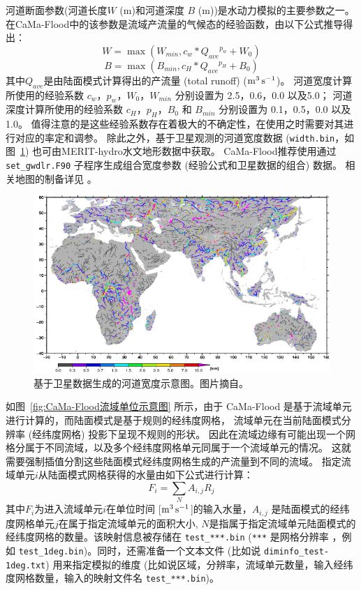 河道断面参数(河道长度$W$ (m)和河道深度 $B$ (m))是水动力模拟的主要参数之一。在CaMa-Flood中的该参数是流域产流量的气候态的经验函数，由以下公式推导得出：
\begin{equation}
W=\max \left(W_{min}, c_{w} * Q_{ave}{}^{p_{w}}+W_{0}\right)
\end{equation}
\begin{equation}
B=\max \left(B_{min}, c_{H} * Q_{ave}{}^{p_{H}}+B_{0}\right)
\end{equation}
其中$Q_{ave}$是由陆面模式计算得出的产流量 (total runoff) ($\rm m^3\,s^{-1}$)。
河道宽度计算所使用的经验系数 $c_w$，$p_w$，$W_0$，$W_{min}$ 分别设置为 2.5，0.6，0.0 以及5.0；
河道深度计算所使用的经验系数 $c_H$，$p_H$，$B_0$ 和 $B_{min}$ 分别设置为 0.1，0.5，0.0 以及1.0。
值得注意的是这些经验系数存在着极大的不确定性，在使用之时需要对其进行对应的率定和调参。
除此之外，基于卫星观测的河道宽度数据 (\texttt{width.bin}，如图~\ref{fig:基于卫星数据生成的河道宽度示意图}) 也可由MERIT-hydro水文地形数据中获取。
CaMa-Flood推荐使用通过 \texttt{set\_gwdlr.F90} 子程序生成组合宽度参数 (经验公式和卫星数据的组合) 数据。
相关地图的制备详见 \citet{yamazaki2014regional, yamazaki2014development}。
{
\begin{figure}[]
\centering
\includegraphics{Figures/陆地表面的水分循环/基于卫星数据生成的河道宽度示意图.png}
\caption{基于卫星数据生成的河道宽度示意图。图片摘自\citet{yamazaki2011physically}。}
\label{fig:基于卫星数据生成的河道宽度示意图}
\end{figure}
}

如图~\ref{fig:CaMa-Flood流域单位示意图} 所示，由于 CaMa-Flood 是基于流域单元进行计算的，而陆面模式是基于规则的经纬度网格，
流域单元在当前陆面模式分辨率 (经纬度网格) 投影下呈现不规则的形状。
因此在流域边缘有可能出现一个网格分属于不同流域，以及多个经纬度网格单元同属于一个流域单元的情况。
这就需要强制插值分割这些陆面模式经纬度网格生成的产流量到不同的流域。
指定流域单元$i$从陆面模式网格获得的水量由如下公式进行计算：
\begin{equation}
F_{i}=\sum_{N} A_{i, j} R_{j}
\end{equation}
其中$F_i$为进入流域单元$i$在单位时间 [$\rm m^3\,s^{-1}$]的输入水量，$A_{i, j}$ 是陆面模式的经纬度网格单元$j$在属于指定流域单元的面积大小,
 $N$是指属于指定流域单元陆面模式的经纬度网格的数量。该映射信息被存储在 \texttt{test\_***.bin} (\texttt{***} 是网格分辨率
 ，例如 \texttt{test\_1deg.bin})。同时，还需准备一个文本文件 (比如说 \texttt{diminfo\_test-1deg.txt}) 用来指定模拟的维度
  (比如说区域，分辨率，流域单元数量，输入经纬度网格数量，输入的映射文件名 \texttt{test\_***.bin})。

